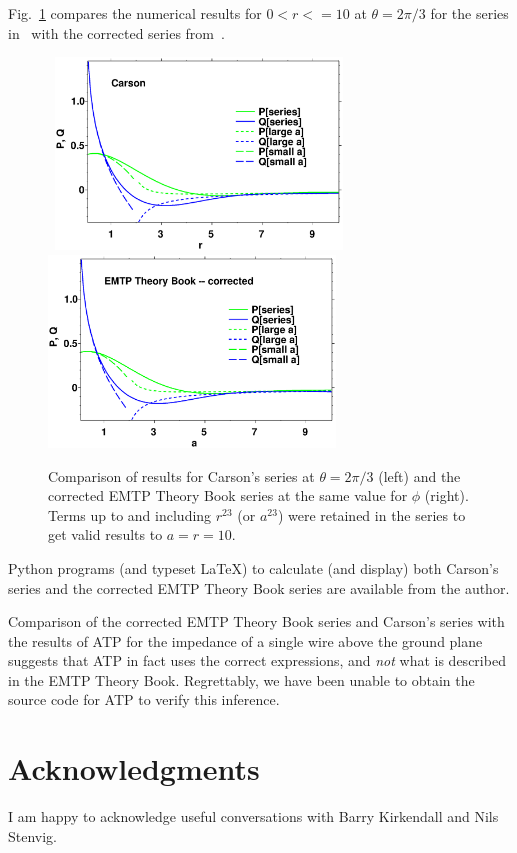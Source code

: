 \documentclass[12pt,fleqn]{article}
\begin{document}
Fig.~\ref{fig:l} compares the numerical results for $0 < r <= 10$ at  $\theta = 2\pi/3$ for the series in~\cite{Carson} with the corrected series from~\cite{EMTP}. 
\begin{figure}[H]
  \hbox{
     \includegraphics[width=3in]{carson.ps}
     \includegraphics[width=3in]{emtp.ps}
  }
  \caption{Comparison of results for Carson's series at $\theta = 2\pi/3$ (left) and the corrected EMTP Theory Book series at the same value for $\phi$ (right). Terms up to and including $r^{23}$ (or $a^{23}$) were retained in the series to get valid results to $a = r = 10$.}
  \label{fig:l}
\end{figure}

Python programs (and typeset \LaTeX) to calculate (and display) both Carson's series and the corrected EMTP Theory Book series are available from the author.

Comparison of the corrected EMTP Theory Book series and Carson's series with the results of ATP for the impedance of a single wire above
the ground plane suggests that ATP in fact uses the correct expressions, and \emph{not} what is described in the EMTP Theory Book. Regrettably, we have been unable to obtain the source code for ATP to verify this inference.

\section*{Acknowledgments}

I am happy to acknowledge useful conversations with Barry Kirkendall and Nils Stenvig.
\end{document}
